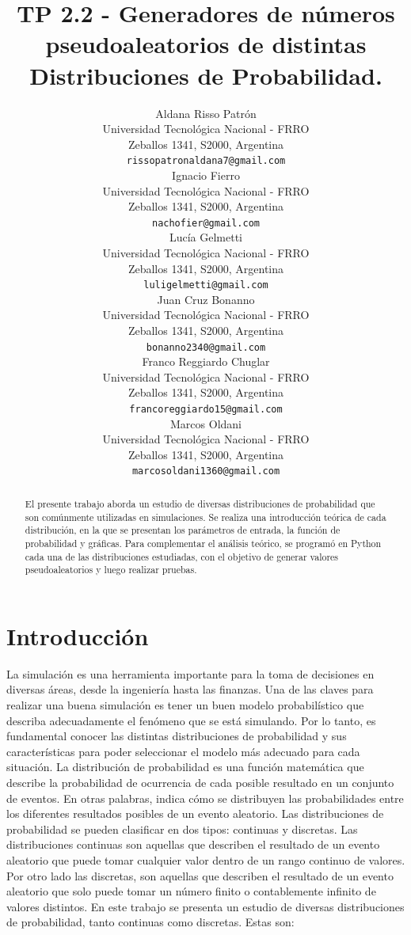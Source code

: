 \documentclass{article}
\title{TP 2.2 - Generadores de números pseudoaleatorios de distintas Distribuciones de Probabilidad.}
\author{
 Aldana Risso Patrón \\
  Universidad Tecnológica Nacional - FRRO \\
  Zeballos 1341, S2000, Argentina \\
  \texttt{rissopatronaldana7@gmail.com} \\
   \And
 Ignacio Fierro \\
  Universidad Tecnológica Nacional - FRRO \\
  Zeballos 1341, S2000, Argentina \\
  \texttt{nachofier@gmail.com} \\
  \And
 Lucía Gelmetti \\
  Universidad Tecnológica Nacional - FRRO \\
  Zeballos 1341, S2000, Argentina \\
  \texttt{luligelmetti@gmail.com} \\
  \And
 Juan Cruz Bonanno \\
  Universidad Tecnológica Nacional - FRRO \\
  Zeballos 1341, S2000, Argentina \\
  \texttt{bonanno2340@gmail.com} \\
  \And
 Franco Reggiardo Chuglar \\
  Universidad Tecnológica Nacional - FRRO\\
  Zeballos 1341, S2000, Argentina \\
  \texttt{francoreggiardo15@gmail.com} \\
  \And
 Marcos Oldani \\
  Universidad Tecnológica Nacional - FRRO \\
  Zeballos 1341, S2000, Argentina \\
  \texttt{marcosoldani1360@gmail.com} \\
}
\begin{document}
\maketitle
\begin{abstract}
El presente trabajo aborda un estudio de diversas distribuciones de probabilidad que son comúnmente
 utilizadas en simulaciones. Se realiza una introducción teórica de cada distribución, en la que se
 presentan los parámetros de entrada, la función de probabilidad y gráficas. Para complementar el
 análisis teórico, se programó en Python cada una de las distribuciones estudiadas, con el objetivo de
 generar valores pseudoaleatorios y luego realizar pruebas.
\end{abstract}

\section{Introducción}
 La simulación es una herramienta importante para la toma de decisiones en diversas áreas, desde la ingeniería hasta las finanzas. Una de las claves para realizar una buena simulación es tener un buen modelo probabilístico que describa adecuadamente el fenómeno que se está simulando. Por lo tanto, es fundamental conocer las distintas distribuciones de probabilidad y sus características para poder seleccionar el modelo más adecuado para cada situación.
 La distribución de probabilidad es una función matemática que describe la probabilidad de ocurrencia de cada posible resultado en un conjunto de eventos. En otras palabras, indica cómo se distribuyen las probabilidades entre los diferentes resultados posibles de un evento aleatorio. Las distribuciones de probabilidad se pueden clasificar en dos tipos: continuas y discretas. Las distribuciones continuas son aquellas que describen el resultado de un evento aleatorio que puede tomar cualquier valor dentro de un rango continuo de valores. Por otro lado las discretas, son aquellas que describen el resultado de un evento aleatorio que solo puede tomar un número finito o contablemente infinito de valores distintos.
 En este trabajo se presenta un estudio de diversas distribuciones de probabilidad, tanto continuas como discretas. Estas son:
\end{document}
